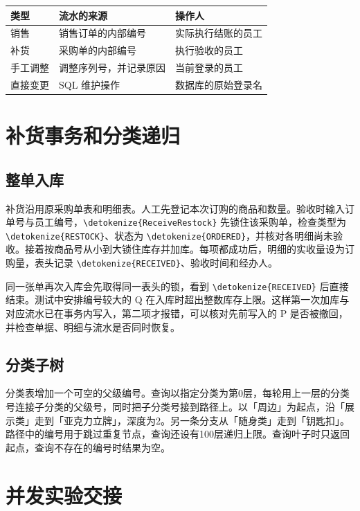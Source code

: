 \documentclass{SYSUReport}
\newcommand{\code}[1]{\expandafter\nolinkurl\expandafter{\detokenize{#1}}}
\begin{document}
\begin{center}
\begin{tabularx}{\textwidth}{lYY}
\toprule
类型 & 流水的来源 & 操作人 \\
\midrule
销售 & 销售订单的内部编号 & 实际执行结账的员工 \\
补货 & 采购单的内部编号 & 执行验收的员工 \\
手工调整 & 调整序列号，并记录原因 & 当前登录的员工 \\
直接变更 & SQL 维护操作 & 数据库的原始登录名 \\
\bottomrule
\end{tabularx}
\end{center}

\section{补货事务和分类递归}

\subsection{整单入库}

补货沿用原采购单表和明细表。人工先登记本次订购的商品和数量。验收时输入订单号与员工编号，\code{ReceiveRestock} 先锁住该采购单，检查类型为 \code{RESTOCK}、状态为 \code{ORDERED}，并核对各明细尚未验收。接着按商品号从小到大锁住库存并加库。每项都成功后，明细的实收量设为订购量，表头记录 \code{RECEIVED}、验收时间和经办人。

同一张单再次入库会先取得同一表头的锁，看到 \code{RECEIVED} 后直接结束。测试中安排编号较大的 Q 在入库时超出整数库存上限。这样第一次加库与对应流水已在事务内写入，第二项才报错，可以核对先前写入的 P 是否被撤回，并检查单据、明细与流水是否同时恢复。

\subsection{分类子树}

分类表增加一个可空的父级编号。查询以指定分类为第0层，每轮用上一层的分类号连接子分类的父级号，同时把子分类号接到路径上。以「周边」为起点，沿「展示类」走到「亚克力立牌」，深度为2。另一条分支从「随身类」走到「钥匙扣」。路径中的编号用于跳过重复节点，查询还设有100层递归上限。查询叶子时只返回起点，查询不存在的编号时结果为空。

\section{并发实验交接}
\end{document}
